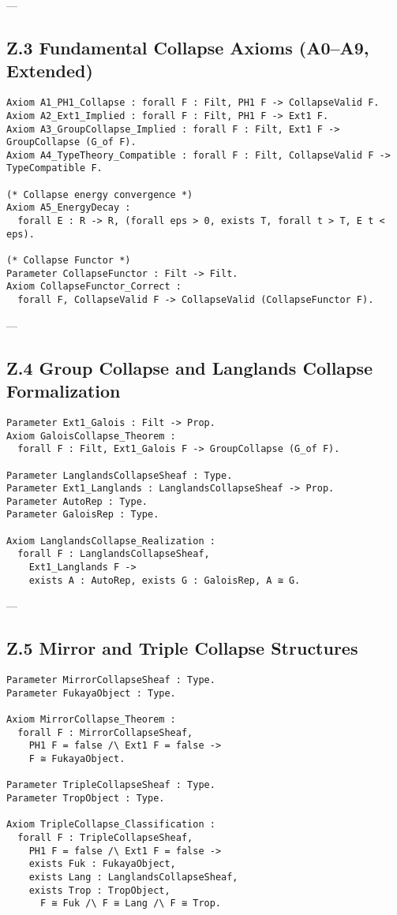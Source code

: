\documentclass[11pt]{article}
\begin{document}
---

\subsection*{Z.3 Fundamental Collapse Axioms (A0–A9, Extended)}

\begin{lstlisting}[language=Coq]
Axiom A1_PH1_Collapse : forall F : Filt, PH1 F -> CollapseValid F.
Axiom A2_Ext1_Implied : forall F : Filt, PH1 F -> Ext1 F.
Axiom A3_GroupCollapse_Implied : forall F : Filt, Ext1 F -> GroupCollapse (G_of F).
Axiom A4_TypeTheory_Compatible : forall F : Filt, CollapseValid F -> TypeCompatible F.

(* Collapse energy convergence *)
Axiom A5_EnergyDecay :
  forall E : R -> R, (forall eps > 0, exists T, forall t > T, E t < eps).

(* Collapse Functor *)
Parameter CollapseFunctor : Filt -> Filt.
Axiom CollapseFunctor_Correct :
  forall F, CollapseValid F -> CollapseValid (CollapseFunctor F).
\end{lstlisting}

---

\subsection*{Z.4 Group Collapse and Langlands Collapse Formalization}

\begin{lstlisting}[language=Coq]
Parameter Ext1_Galois : Filt -> Prop.
Axiom GaloisCollapse_Theorem :
  forall F : Filt, Ext1_Galois F -> GroupCollapse (G_of F).

Parameter LanglandsCollapseSheaf : Type.
Parameter Ext1_Langlands : LanglandsCollapseSheaf -> Prop.
Parameter AutoRep : Type.
Parameter GaloisRep : Type.

Axiom LanglandsCollapse_Realization :
  forall F : LanglandsCollapseSheaf,
    Ext1_Langlands F ->
    exists A : AutoRep, exists G : GaloisRep, A ≅ G.
\end{lstlisting}

---

\subsection*{Z.5 Mirror and Triple Collapse Structures}

\begin{lstlisting}[language=Coq]
Parameter MirrorCollapseSheaf : Type.
Parameter FukayaObject : Type.

Axiom MirrorCollapse_Theorem :
  forall F : MirrorCollapseSheaf,
    PH1 F = false /\ Ext1 F = false ->
    F ≅ FukayaObject.

Parameter TripleCollapseSheaf : Type.
Parameter TropObject : Type.

Axiom TripleCollapse_Classification :
  forall F : TripleCollapseSheaf,
    PH1 F = false /\ Ext1 F = false ->
    exists Fuk : FukayaObject,
    exists Lang : LanglandsCollapseSheaf,
    exists Trop : TropObject,
      F ≅ Fuk /\ F ≅ Lang /\ F ≅ Trop.
\end{lstlisting}
\end{document}
